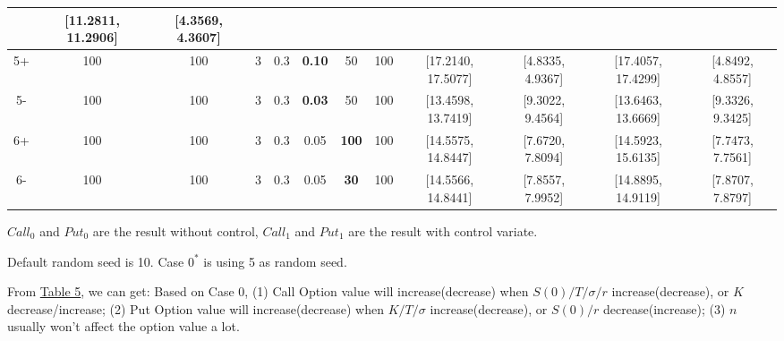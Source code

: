 \documentclass[11pt,a4paper]{article}
\begin{document}
\begin{table}[h]
{\begin{tabular}{|c|c|c|c|c|c|c|c|c|c|c|c|}
            & [11.2811, 11.2906] & [4.3569, 4.3607]\\
            \hline
            5+ & 100 & 100 & 3 & 0.3 & \textbf{0.10} & 50 & 100 
            & [17.2140, 17.5077] & [4.8335, 4.9367] 
            & [17.4057, 17.4299] & [4.8492, 4.8557]\\
            \hline
            5- & 100 & 100 & 3 & 0.3 & \textbf{0.03} & 50 & 100 
            & [13.4598, 13.7419] & [9.3022, 9.4564] 
            & [13.6463, 13.6669] & [9.3326, 9.3425]\\
            \hline
            6+ & 100 & 100 & 3 & 0.3 & 0.05 & \textbf{100} & 100
            & [14.5575, 14.8447] & [7.6720, 7.8094] 
            & [14.5923, 15.6135] & [7.7473, 7.7561]\\
            \hline
            6- & 100 & 100 & 3 & 0.3 & 0.05 & \textbf{30} & 100
            & [14.5566, 14.8441] & [7.8557, 7.9952] 
            & [14.8895, 14.9119] & [7.8707, 7.8797]\\
            \hline
    \end{tabular}
        }
        \footnotesize

    $Call_0$ and $Put_0$ are the result without control,
    $Call_1$ and $Put_1$ are the result with control variate.

    Default random seed is 10. 
    Case $0^*$ is using 5 as random seed.
    \end{table}

    From \hyperref[T5]{Table 5}, we can get: Based on Case 0,
    (1) Call Option value will increase(decrease) when 
    $ S(0) /  T / \sigma / r$ increase(decrease), or
    $ K$ decrease/increase; 
    (2) Put Option value will increase(decrease) when
    $ K / T / \sigma $ increase(decrease), or
    $ S(0) / r$ decrease(increase);
    (3) $n$ usually won't affect the option value a lot.

    
\end{document}

